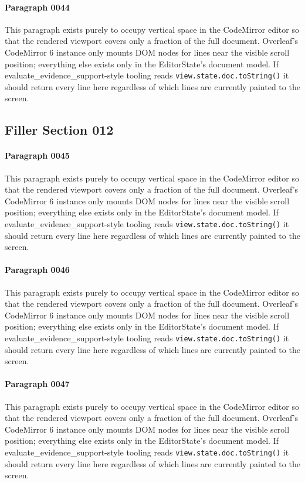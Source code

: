\documentclass{article}
\begin{document}
\paragraph{Paragraph 0044}
This paragraph exists purely to occupy vertical space in the CodeMirror editor so that the rendered viewport covers only a fraction of the full document. Overleaf's CodeMirror 6 instance only mounts DOM nodes for lines near the visible scroll position; everything else exists only in the EditorState's document model. If evaluate\_evidence\_support-style tooling reads \texttt{view.state.doc.toString()} it should return every line here regardless of which lines are currently painted to the screen.

\subsection{Filler Section 012}
\paragraph{Paragraph 0045}
This paragraph exists purely to occupy vertical space in the CodeMirror editor so that the rendered viewport covers only a fraction of the full document. Overleaf's CodeMirror 6 instance only mounts DOM nodes for lines near the visible scroll position; everything else exists only in the EditorState's document model. If evaluate\_evidence\_support-style tooling reads \texttt{view.state.doc.toString()} it should return every line here regardless of which lines are currently painted to the screen.

\paragraph{Paragraph 0046}
This paragraph exists purely to occupy vertical space in the CodeMirror editor so that the rendered viewport covers only a fraction of the full document. Overleaf's CodeMirror 6 instance only mounts DOM nodes for lines near the visible scroll position; everything else exists only in the EditorState's document model. If evaluate\_evidence\_support-style tooling reads \texttt{view.state.doc.toString()} it should return every line here regardless of which lines are currently painted to the screen.

\paragraph{Paragraph 0047}
This paragraph exists purely to occupy vertical space in the CodeMirror editor so that the rendered viewport covers only a fraction of the full document. Overleaf's CodeMirror 6 instance only mounts DOM nodes for lines near the visible scroll position; everything else exists only in the EditorState's document model. If evaluate\_evidence\_support-style tooling reads \texttt{view.state.doc.toString()} it should return every line here regardless of which lines are currently painted to the screen.
\end{document}
